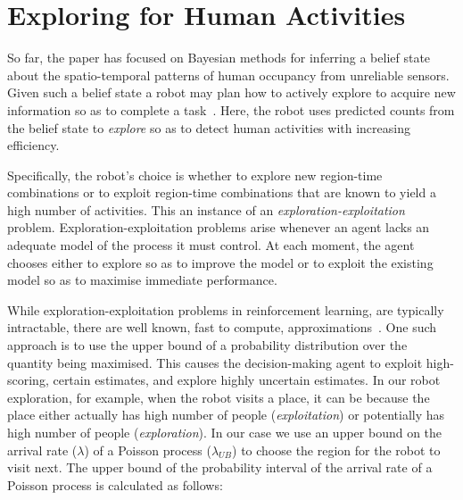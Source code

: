 
\section{Exploring for Human Activities}
\label{sec:exploration}

So far, the paper has focused on Bayesian methods for inferring a belief state about the spatio-temporal patterns of human occupancy from unreliable sensors. Given such a belief state a robot may plan how to actively explore to acquire new information so as to complete a task~\cite{hanheide2017robot,sridharan2019reba}. Here, the robot uses predicted counts from the belief state to \emph{explore} so as to detect human activities with increasing efficiency. 

Specifically, the robot's choice is whether to explore new region-time combinations or to exploit region-time combinations that are known to yield a high number of activities. This an instance of an \emph{exploration-exploitation} problem. Exploration-exploitation problems arise whenever an agent lacks an adequate model of the process it must control. At each moment, the agent chooses either to explore so as to improve the model or to exploit the existing model so as to maximise immediate performance. 

While exploration-exploitation problems in reinforcement learning, are typically intractable, there are well known, fast to compute, approximations~\cite{wyatt1998exploration,1413255,AUDIBERT20091876}. One such approach is to use the upper bound of a probability distribution over the quantity being maximised. This causes the decision-making agent to exploit high-scoring, certain estimates, and explore highly uncertain estimates. In our robot exploration, for example, when the robot visits a place, it can be because the place either actually has high number of people (\textit{exploitation}) or potentially has high number of people (\textit{exploration}). In our case we use an upper bound on the arrival rate ($\lambda$) of a Poisson process ($\lambda_{UB}$) to choose the region for the robot to visit next. The upper bound of the probability interval of the arrival rate of a Poisson process is calculated as follows:

